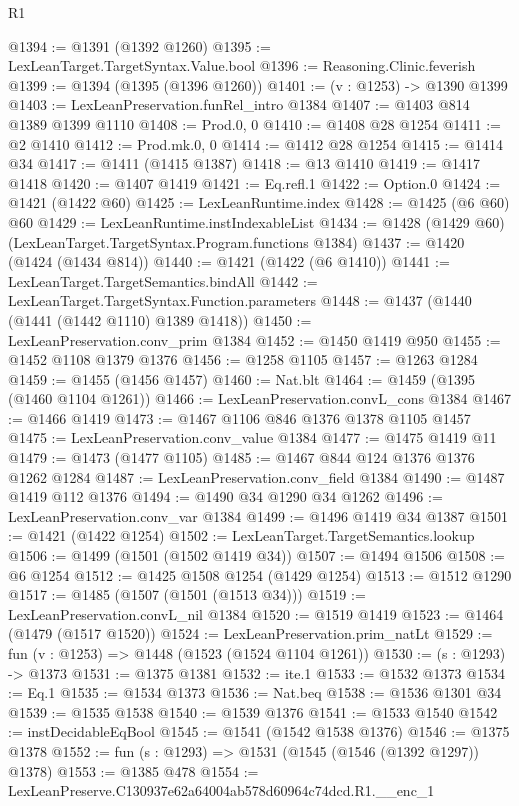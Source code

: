 \begin{lexlean}{R1}
\begin{coremodule}
@1394 := @1391 (@1392 @1260)
@1395 := LexLeanTarget.TargetSyntax.Value.bool
@1396 := Reasoning.Clinic.feverish
@1399 := @1394 (@1395 (@1396 @1260))
@1401 := (v : @1253) -> @1390 @1399
@1403 := LexLeanPreservation.funRel_intro @1384
@1407 := @1403 @814 @1389 @1399 @1110
@1408 := Prod.{0, 0}
@1410 := @1408 @28 @1254
@1411 := @2 @1410
@1412 := Prod.mk.{0, 0}
@1414 := @1412 @28 @1254
@1415 := @1414 @34
@1417 := @1411 (@1415 @1387)
@1418 := @13 @1410
@1419 := @1417 @1418
@1420 := @1407 @1419
@1421 := Eq.refl.{1}
@1422 := Option.{0}
@1424 := @1421 (@1422 @60)
@1425 := LexLeanRuntime.index
@1428 := @1425 (@6 @60) @60
@1429 := LexLeanRuntime.instIndexableList
@1434 := @1428 (@1429 @60) (LexLeanTarget.TargetSyntax.Program.functions @1384)
@1437 := @1420 (@1424 (@1434 @814))
@1440 := @1421 (@1422 (@6 @1410))
@1441 := LexLeanTarget.TargetSemantics.bindAll
@1442 := LexLeanTarget.TargetSyntax.Function.parameters
@1448 := @1437 (@1440 (@1441 (@1442 @1110) @1389 @1418))
@1450 := LexLeanPreservation.conv_prim @1384
@1452 := @1450 @1419 @950
@1455 := @1452 @1108 @1379 @1376
@1456 := @1258 @1105
@1457 := @1263 @1284
@1459 := @1455 (@1456 @1457)
@1460 := Nat.blt
@1464 := @1459 (@1395 (@1460 @1104 @1261))
@1466 := LexLeanPreservation.convL_cons @1384
@1467 := @1466 @1419
@1473 := @1467 @1106 @846 @1376 @1378 @1105 @1457
@1475 := LexLeanPreservation.conv_value @1384
@1477 := @1475 @1419 @11
@1479 := @1473 (@1477 @1105)
@1485 := @1467 @844 @124 @1376 @1376 @1262 @1284
@1487 := LexLeanPreservation.conv_field @1384
@1490 := @1487 @1419 @112 @1376
@1494 := @1490 @34 @1290 @34 @1262
@1496 := LexLeanPreservation.conv_var @1384
@1499 := @1496 @1419 @34 @1387
@1501 := @1421 (@1422 @1254)
@1502 := LexLeanTarget.TargetSemantics.lookup
@1506 := @1499 (@1501 (@1502 @1419 @34))
@1507 := @1494 @1506
@1508 := @6 @1254
@1512 := @1425 @1508 @1254 (@1429 @1254)
@1513 := @1512 @1290
@1517 := @1485 (@1507 (@1501 (@1513 @34)))
@1519 := LexLeanPreservation.convL_nil @1384
@1520 := @1519 @1419
@1523 := @1464 (@1479 (@1517 @1520))
@1524 := LexLeanPreservation.prim_natLt
@1529 := fun (v : @1253) => @1448 (@1523 (@1524 @1104 @1261))
@1530 := (s : @1293) -> @1373
@1531 := @1375 @1381
@1532 := ite.{1}
@1533 := @1532 @1373
@1534 := Eq.{1}
@1535 := @1534 @1373
@1536 := Nat.beq
@1538 := @1536 @1301 @34
@1539 := @1535 @1538
@1540 := @1539 @1376
@1541 := @1533 @1540
@1542 := instDecidableEqBool
@1545 := @1541 (@1542 @1538 @1376)
@1546 := @1375 @1378
@1552 := fun (s : @1293) => @1531 (@1545 (@1546 (@1392 @1297)) @1378)
@1553 := @1385 @478
@1554 := LexLeanPreserve.C130937e62a64004ab578d60964c74dcd.R1.__enc_1

\end{coremodule}
\end{lexlean}
